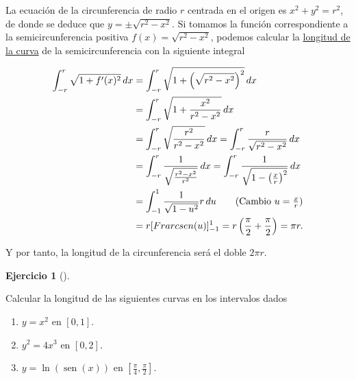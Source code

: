 \documentclass[
  spanish,
  a4paper,
]{scrreport}
\theoremstyle{definition}
\newtheorem{exercise}{Ejercicio}[chapter]
\theoremstyle{remark}
\begin{document}
\begin{tcolorbox}[enhanced jigsaw, arc=.35mm, bottomrule=.15mm, bottomtitle=1mm, breakable, colback=white, colbacktitle=quarto-callout-tip-color!10!white, colframe=quarto-callout-tip-color-frame, coltitle=black, left=2mm, leftrule=.75mm, opacityback=0, opacitybacktitle=0.6, rightrule=.15mm, title=\textcolor{quarto-callout-tip-color}{\faLightbulb}\hspace{0.5em}{Solución}, titlerule=0mm, toprule=.15mm, toptitle=1mm]

La ecuación de la circunferencia de radio \(r\) centrada en el origen es
\(x^2+y^2=r^2\), de donde se deduce que \(y=\pm\sqrt{r^2-x^2}\). Si
tomamos la función correspondiente a la semicircunferencia positiva
\(f(x)=\sqrt{r^2-x^2}\), podemos calcular la
\href{https://aprendeconalf.es/analisis-manual/08-integrales.html\#c\%C3\%A1lculo-de-la-longitud-de-una-curva}{longitud
de la curva} de la semicircunferencia con la siguiente integral

\begin{align*}
\int_{-r}^r \sqrt{1+f'(x)^2}\,dx
&= \int_{-r}^r \sqrt{1+\left({\sqrt{r^2-x^2}}\right)^2}\,dx \\
&= \int_{-r}^r \sqrt{1+\frac{x^2}{r^2-x^2}}\,dx \\
&= \int_{-r}^r \sqrt{\frac{r^2}{r^2-x^2}}\,dx 
= \int_{-r}^r \frac{r}{\sqrt{r^2-x^2}}\,dx \\
&= \int_{-r}^r \frac{1}{\sqrt{\frac{r^2-x^2}{r^2}}}\,dx
= \int_{-r}^r \frac{1}{\sqrt{1-\left(\frac{x}{r}\right)^2}}\,dx \\
&= \int_{-1}^1 \frac{1}{\sqrt{1-u^2}} r\,du \tag{Cambio $u=\frac{x}{r}$}\\
&= r[\operatorname{arcsen}(u)]_{-1}^1 
= r \left(\frac{\pi}{2}+\frac{\pi}{2}\right)
= \pi r.
\end{align*}

Y por tanto, la longitud de la circunferencia será el doble \(2\pi r\).

\end{tcolorbox}

\begin{exercise}[]\protect\hypertarget{exr-longitud-curvas}{}\label{exr-longitud-curvas}

Calcular la longitud de las siguientes curvas en los intervalos dados

\begin{enumerate}
\def\labelenumi{\alph{enumi}.}
\item
  \(y=x^2\) en \([0,1]\).
\item
  \(y^2=4x^3\) en \([0,2]\).
\item
  \(y=\ln(\operatorname{sen}(x))\) en
  \(\left[\frac{\pi}{4},\frac{\pi}{2}\right]\).
\end{enumerate}

\end{exercise}
\end{document}
